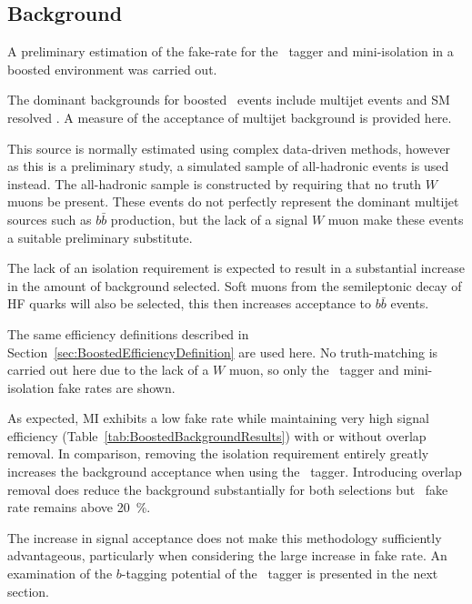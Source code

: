 \subsection{Background}

A preliminary estimation of the fake-rate for the \xsm\ tagger and mini-isolation in a boosted environment was carried out.

The dominant backgrounds for boosted \ttbar\ events include multijet events and SM resolved \ttbar. A measure of the acceptance of multijet background is provided here. 

This source is normally estimated using complex data-driven methods, however as this is a preliminary study, a simulated sample of all-hadronic events is used instead. The all-hadronic sample is constructed by requiring that no truth $W$ muons be present. These events do not perfectly represent the dominant multijet sources such as $b\bar{b}$ production, but the lack of a signal $W$ muon make these events a suitable preliminary substitute. 

The lack of an isolation requirement is expected to result in a substantial increase in the amount of background selected. Soft muons from the semileptonic decay of HF quarks will also be selected, this then increases acceptance to $b\bar{b}$ events.

The same efficiency definitions described in Section~\ref{sec:BoostedEfficiencyDefinition} are used here. No truth-matching is carried out here due to the lack of a $W$ muon, so only the \xsm\ tagger and mini-isolation fake rates are shown. 

As expected, MI exhibits a low fake rate while maintaining very high signal efficiency (Table~\ref{tab:BoostedBackgroundResults}) with or without overlap removal. In comparison, removing the isolation requirement entirely greatly increases the background acceptance when using the \xsm\ tagger. Introducing overlap removal does reduce the background substantially for both selections but \xsm\ fake rate remains above \SI{20}{\percent}. 

The increase in signal acceptance does not make this methodology sufficiently advantageous, particularly when considering the large increase in fake rate. An examination of the $b$-tagging potential of the \xsm\ tagger is presented in the next section.

